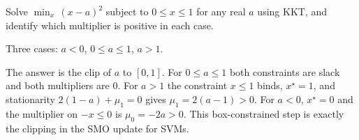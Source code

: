 \begin{problem}
	\twochili
	Solve $\min_{x}\,(x-a)^2$ subject to $0\le x\le1$ for any real $a$ using KKT, and identify which
	multiplier is positive in each case.
	\begin{hint}
		Three cases: $a<0$, $0\le a\le1$, $a>1$.
	\end{hint}
	\begin{sol}
		The answer is the clip of $a$ to $[0,1]$. For $0\le a\le 1$ both constraints are slack and
		both multipliers are $0$. For $a>1$ the constraint $x\le1$ binds, $x^\star=1$, and
		stationarity $2(1-a)+\mu_1=0$ gives $\mu_1=2(a-1)>0$. For $a<0$, $x^\star=0$ and the
		multiplier on $-x\le0$ is $\mu_0=-2a>0$. This box-constrained step is exactly the clipping
		in the SMO update for SVMs.
	\end{sol}
\end{problem}
